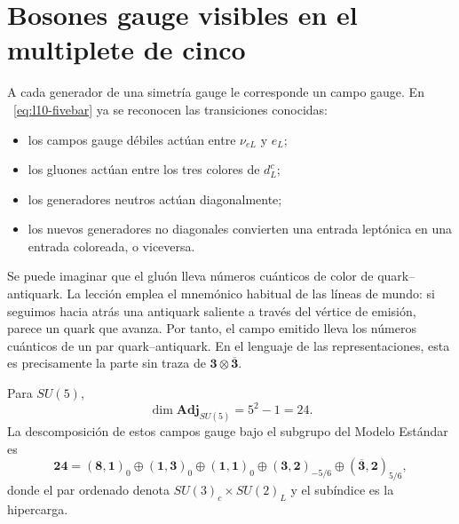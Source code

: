 \begin{classroomqa}
\end{classroomqa}

\section{Bosones gauge visibles en el multiplete de cinco}

A cada generador de una simetría gauge le corresponde un campo gauge. En ~\eqref{eq:l10-fivebar} ya se reconocen las transiciones conocidas:
\begin{itemize}
\item los campos gauge débiles actúan entre \(\nu_{eL}\) y \(e_L\);
\item los gluones actúan entre los tres colores de \(d^c_L\);
\item los generadores neutros actúan diagonalmente;
\item los nuevos generadores no diagonales convierten una entrada leptónica en una entrada coloreada, o viceversa.
\end{itemize}

Se puede imaginar que el gluón lleva números cuánticos de color de quark--antiquark. La lección emplea el mnemónico habitual de las líneas de mundo: si seguimos hacia atrás una antiquark saliente a través del vértice de emisión, parece un quark que avanza. Por tanto, el campo emitido lleva los números cuánticos de un par quark--antiquark. En el lenguaje de las representaciones, esta es precisamente la parte sin traza de \(\mathbf3\otimes\overline{\mathbf3}\).

Para \(SU(5)\),
\begin{equation}
\dim\mathbf{Adj}_{SU(5)}=5^2-1=24.
\end{equation}
La descomposición de estos campos gauge bajo el subgrupo del Modelo Estándar es
\begin{equation}
\mathbf{24}
=
(\mathbf8,\mathbf1)_0
\oplus(\mathbf1,\mathbf3)_0
\oplus(\mathbf1,\mathbf1)_0
\oplus(\mathbf3,\mathbf2)_{-5/6}
\oplus(\overline{\mathbf3},\mathbf2)_{5/6},
\label{eq:l10-adjoint-sm}
\end{equation}
donde el par ordenado denota \(SU(3)_c\times SU(2)_L\) y el subíndice es la hipercarga.

